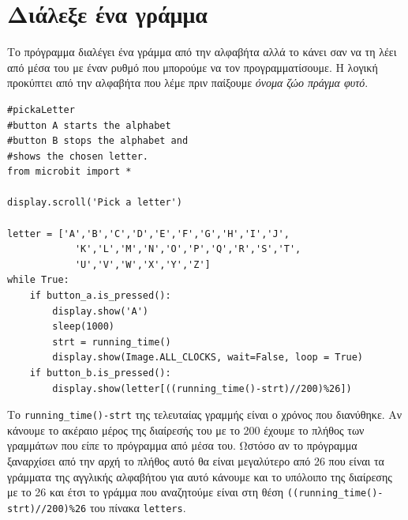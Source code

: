 \documentclass[11pt]{article}
\begin{document}
\section{Διάλεξε ένα γράμμα}
Το πρόγραμμα διαλέγει ένα γράμμα από την αλφαβήτα αλλά το κάνει σαν να τη λέει από μέσα του με έναν ρυθμό που μπορούμε 
να τον προγραμματίσουμε. Η λογική προκύπτει από την αλφαβήτα που λέμε πριν παίξουμε \emph{όνομα ζώο πράγμα φυτό}.
\begin{lstlisting}
#pickaLetter
#button A starts the alphabet
#button B stops the alphabet and 
#shows the chosen letter.
from microbit import *

display.scroll('Pick a letter')

letter = ['A','B','C','D','E','F','G','H','I','J',
            'K','L','M','N','O','P','Q','R','S','T',
            'U','V','W','X','Y','Z']
while True:
    if button_a.is_pressed():
        display.show('A')
        sleep(1000)
        strt = running_time()
        display.show(Image.ALL_CLOCKS, wait=False, loop = True)
    if button_b.is_pressed():
        display.show(letter[((running_time()-strt)//200)%26])
\end{lstlisting}
Το \lstinline{running_time()-strt} της τελευταίας γραμμής είναι ο χρόνος που διανύθηκε. Αν κάνουμε το ακέραιο μέρος της διαίρεσής του 
με το 200 έχουμε το πλήθος των γραμμάτων που είπε το πρόγραμμα από μέσα του. Ωστόσο αν το πρόγραμμα ξαναρχίσει από την αρχή
το πλήθος αυτό θα είναι μεγαλύτερο από 26 που είναι τα γράμματα της αγγλικής αλφαβήτου για αυτό κάνουμε και το υπόλοιπο της 
διαίρεσης με το 26 και έτσι το γράμμα που αναζητούμε είναι στη θέση \lstinline{((running_time()-strt)//200)%26} του πίνακα 
\lstinline{letters}.
\end{document}
